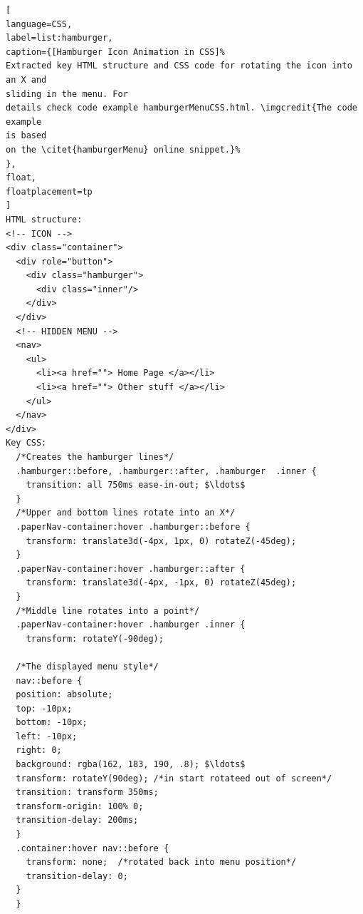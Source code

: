 \begin{lstlisting}[
language=CSS,
label=list:hamburger,
caption={[Hamburger Icon Animation in CSS]%
Extracted key HTML structure and CSS code for rotating the icon into an X and 
sliding in the menu. For 
details check code example hamburgerMenuCSS.html. \imgcredit{The code example 
is based 
on the \citet{hamburgerMenu} online snippet.}%
},
float,
floatplacement=tp
]
HTML structure:
<!-- ICON -->
<div class="container">
  <div role="button">
    <div class="hamburger">
      <div class="inner"/>
    </div>
  </div>
  <!-- HIDDEN MENU -->
  <nav>
    <ul>
      <li><a href=""> Home Page </a></li>
      <li><a href=""> Other stuff </a></li>
    </ul> 
  </nav>
</div>
Key CSS:
  /*Creates the hamburger lines*/
  .hamburger::before, .hamburger::after, .hamburger  .inner {
    transition: all 750ms ease-in-out; $\ldots$
  }
  /*Upper and bottom lines rotate into an X*/
  .paperNav-container:hover .hamburger::before {
    transform: translate3d(-4px, 1px, 0) rotateZ(-45deg);  
  }
  .paperNav-container:hover .hamburger::after {
    transform: translate3d(-4px, -1px, 0) rotateZ(45deg);  
  }
  /*Middle line rotates into a point*/
  .paperNav-container:hover .hamburger .inner {
    transform: rotateY(-90deg); 

  /*The displayed menu style*/
  nav::before {
  position: absolute;
  top: -10px;
  bottom: -10px;
  left: -10px;
  right: 0;
  background: rgba(162, 183, 190, .8); $\ldots$
  transform: rotateY(90deg); /*in start rotateed out of screen*/
  transition: transform 350ms;
  transform-origin: 100% 0;
  transition-delay: 200ms;
  }
  .container:hover nav::before {
    transform: none;  /*rotated back into menu position*/
    transition-delay: 0;
  }
  }\end{lstlisting}

